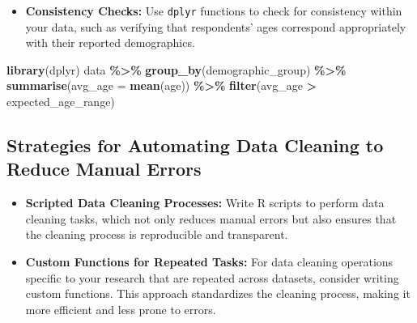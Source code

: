 \documentclass[
]{book}
\newenvironment{Shaded}{\begin{snugshade}}{\end{snugshade}}
\newcommand{\AttributeTok}[1]{\textcolor[rgb]{0.13,0.29,0.53}{#1}}
\newcommand{\CommentTok}[1]{\textcolor[rgb]{0.56,0.35,0.01}{\textit{#1}}}
\newcommand{\ControlFlowTok}[1]{\textcolor[rgb]{0.13,0.29,0.53}{\textbf{#1}}}
\newcommand{\DecValTok}[1]{\textcolor[rgb]{0.00,0.00,0.81}{#1}}
\newcommand{\FunctionTok}[1]{\textcolor[rgb]{0.13,0.29,0.53}{\textbf{#1}}}
\newcommand{\NormalTok}[1]{#1}
\newcommand{\OtherTok}[1]{\textcolor[rgb]{0.56,0.35,0.01}{#1}}
\newcommand{\SpecialCharTok}[1]{\textcolor[rgb]{0.81,0.36,0.00}{\textbf{#1}}}
\providecommand{\tightlist}{%
  \setlength{\itemsep}{0pt}\setlength{\parskip}{0pt}}
\begin{document}
\begin{itemize}
\tightlist
\item
  \textbf{Consistency Checks:} Use \texttt{dplyr} functions to check for consistency within your data, such as verifying that respondents' ages correspond appropriately with their reported demographics.
\end{itemize}

\begin{Shaded}
\begin{Highlighting}[]
\FunctionTok{library}\NormalTok{(dplyr)}
\NormalTok{data }\SpecialCharTok{\%\textgreater{}\%} 
  \FunctionTok{group\_by}\NormalTok{(demographic\_group) }\SpecialCharTok{\%\textgreater{}\%} 
  \FunctionTok{summarise}\NormalTok{(}\AttributeTok{avg\_age =} \FunctionTok{mean}\NormalTok{(age)) }\SpecialCharTok{\%\textgreater{}\%} 
  \FunctionTok{filter}\NormalTok{(avg\_age }\SpecialCharTok{\textgreater{}}\NormalTok{ expected\_age\_range)}
\end{Highlighting}
\end{Shaded}

\hypertarget{strategies-for-automating-data-cleaning-to-reduce-manual-errors}{%
\subsection*{Strategies for Automating Data Cleaning to Reduce Manual Errors}\label{strategies-for-automating-data-cleaning-to-reduce-manual-errors}}

\begin{itemize}
\item
  \textbf{Scripted Data Cleaning Processes:} Write R scripts to perform data cleaning tasks, which not only reduces manual errors but also ensures that the cleaning process is reproducible and transparent.
\item
  \textbf{Custom Functions for Repeated Tasks:} For data cleaning operations specific to your research that are repeated across datasets, consider writing custom functions. This approach standardizes the cleaning process, making it more efficient and less prone to errors.
\end{itemize}

\begin{Shaded}
\end{Shaded}
\end{document}
